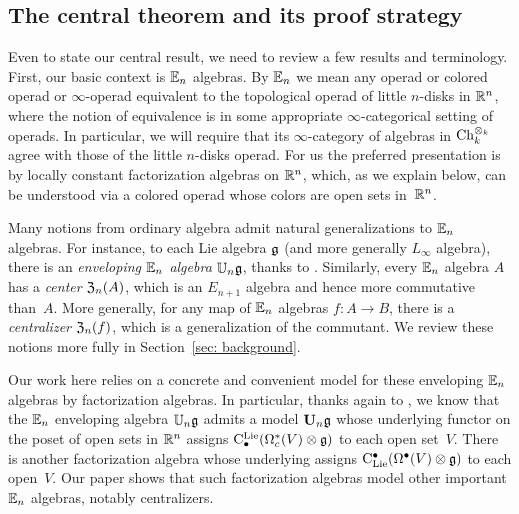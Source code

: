 \documentclass[11pt]{amsart}
\numberwithin{equation}{section}
\def\owen{\textcolor{magenta}{OG: }\textcolor{magenta}}
\begin{document}
\subsection{The central theorem and its proof strategy}


Even to state our central result, we need to review a few results and terminology.
First, our basic context is $\mathbb E_n$ algebras.
By $\mathbb E_n$ we mean any operad or colored operad or $\infty$-operad equivalent to the topological operad of little $n$-disks in $\mathbb R^n$, where the notion of equivalence is in some appropriate $\infty$-categorical setting of operads. 
In particular, we will require that its $\infty$-category of algebras in ${\rm Ch}_k^{\otimes_k}$ agree with those of the little $n$-disks operad. 
For us the preferred presentation is by locally constant factorization algebras on $\mathbb R^n$,
which, as we explain below, can be understood via a colored operad whose colors are open sets in~$\mathbb R^n$.

Many notions from ordinary algebra admit natural generalizations to $\mathbb E_n$ algebras.
For instance, to each Lie algebra $\mathfrak g$ (and more generally $L_\infty$ algebra),
there is an {\em enveloping $\mathbb E_n$ algebra} $\mathbb U_n \mathfrak g$, thanks to \cite{Knudsen}.
Similarly, every $\mathbb E_n$ algebra $A$ has a {\em center} ${\frak Z}_n(A)$, which is an $E_{n+1}$ algebra and hence more commutative than~$A$.
More generally, for any map of $\mathbb E_n$ algebras $f: A \to B$, there is a {\em centralizer} ${\frak Z}_n(f)$, 
which is a generalization of the commutant.
We review these notions more fully in Section~\ref{sec: background}.

Our work here relies on a concrete and convenient model for these enveloping $\mathbb E_n$ algebras by factorization algebras.
In particular, thanks again to \cite{Knudsen}, 
we know that the $\mathbb E_n$ enveloping algebra $\mathbb U_n \mathfrak g$ admits a model $\mathbf U_n \mathfrak g$ whose underlying functor on the poset of open sets in $\mathbb R^n$ assigns ${\rm C}^{\rm Lie}_\bullet(\Omega_c^*(V) \otimes \mathfrak g)$ to each open set~$V$.
There is another factorization algebra whose underlying assigns ${\rm C}_{\rm Lie}^\bullet(\Omega^\bullet(V) \otimes \mathfrak g)$ to each open~$V$.
Our paper shows that such factorization algebras model other important $\mathbb E_n$ algebras, notably centralizers.
\end{document}
